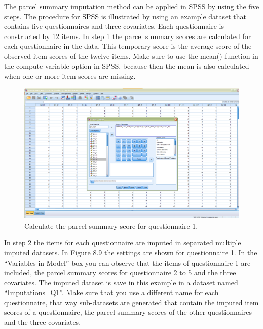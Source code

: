 \documentclass[
]{book}
\begin{document}
The parcel summary imputation method can be applied in SPSS by using the
five steps. The procedure for SPSS is illustrated by using an example
dataset that contains five questionnaires and three covariates. Each
questionnaire is constructed by 12 items. In step 1 the parcel summary
scores are calculated for each questionnaire in the data. This temporary
score is the average score of the observed item scores of the twelve
items. Make sure to use the mean() function in the compute variable
option in SPSS, because then the mean is also calculated when one or
more item scores are missing.

\begin{figure}

{\centering \includegraphics[width=0.9\linewidth]{images/fig8.7} 

}

\caption{Calculate the parcel summary score for questionnaire 1.}\label{fig:fig8-7}
\end{figure}

In step 2 the items for each questionnaire are imputed in separated
multiple imputed datasets. In Figure 8.9 the settings are shown for
questionnaire 1. In the ``Variables in Model'' box you can observe that
the items of questionnaire 1 are included, the parcel summary scores for
questionnaire 2 to 5 and the three covariates. The imputed dataset is
save in this example in a dataset named ``Imputations\_Q1''. Make sure
that you use a different name for each questionnaire, that way
sub-datasets are generated that contain the imputed item scores of a
questionnaire, the parcel summary scores of the other questionnaires and
the three covariates.
\end{document}
